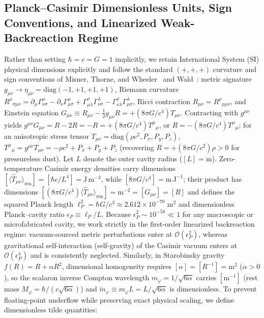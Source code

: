 \documentclass[aps,prd,twocolumn,10pt,showkeys,nofootinbib,floatfix,longbibliography]{revtex4-2}
\begin{document}
\subsection{Planck--Casimir Dimensionless Units, Sign Conventions, and Linearized Weak-Backreaction Regime}
Rather than setting $\hbar = c = G = 1$ implicitly, we retain International System (SI) physical dimensions explicitly and follow the standard $(+,+,+)$ curvature and sign conventions of Misner, Thorne, and Wheeler~\cite{misner1973} and Wald~\cite{wald1984}: metric signature $g_{\mu\nu} \to \eta_{\mu\nu} = \mathrm{diag}(-1,+1,+1,+1)$, Riemann curvature $R^\rho{}_{\sigma\mu\nu} = \partial_\mu\Gamma^\rho_{\nu\sigma} - \partial_\nu\Gamma^\rho_{\mu\sigma} + \Gamma^\rho_{\mu\lambda}\Gamma^\lambda_{\nu\sigma} - \Gamma^\rho_{\nu\lambda}\Gamma^\lambda_{\mu\sigma}$, Ricci contraction $R_{\mu\nu} = R^\rho{}_{\mu\rho\nu}$, and Einstein equation $G_{\mu\nu} \equiv R_{\mu\nu} - \frac{1}{2}g_{\mu\nu}R = +(8\pi G/c^4)T_{\mu\nu}$. Contracting with $g^{\mu\nu}$ yields $g^{\mu\nu}G_{\mu\nu} = R - 2R = -R = +(8\pi G/c^4)T^\mu{}_\mu$, or $R = -(8\pi G/c^4)T^\mu{}_\mu$; for an anisotropic stress tensor $T_{\mu\nu} = \mathrm{diag}(\rho c^2, P_x, P_y, P_z)$, $T^\mu{}_\mu = g^{\mu\nu}T_{\mu\nu} = -\rho c^2 + P_x + P_y + P_z$ (recovering $R = +(8\pi G/c^2)\rho > 0$ for pressureless dust). Let $L$ denote the outer cavity radius ($[L] = \mathrm{m}$). Zero-temperature Casimir energy densities carry dimensions $[\langle\hat{T}_{\mu\nu}\rangle_{\mathrm{ren}}] = [\hbar c / L^4] = \mathrm{J}\,\mathrm{m}^{-3}$, while $[8\pi G/c^4] = \mathrm{m}\,\mathrm{J}^{-1}$; their product has dimensions $[(8\pi G/c^4)\langle\hat{T}_{\mu\nu}\rangle_{\mathrm{ren}}] = \mathrm{m}^{-2} = [G_{\mu\nu}] = [R]$ and defines the squared Planck length $\ell_P^2 = \hbar G / c^3 \approx 2.612 \times 10^{-70}\text{ m}^2$ and dimensionless Planck--cavity ratio $\epsilon_P \equiv \ell_P / L$. Because $\epsilon_P^2 \sim 10^{-58} \ll 1$ for any macroscopic or microfabricated cavity, we work strictly in the first-order linearized backreaction regime: vacuum-sourced metric perturbations enter at $\mathcal{O}(\epsilon_P^2)$, whereas gravitational self-interaction (self-gravity) of the Casimir vacuum enters at $\mathcal{O}(\epsilon_P^4)$ and is consistently neglected. Similarly, in Starobinsky gravity $f(R) = R + \alpha R^2$, dimensional homogeneity requires $[\alpha] = [R^{-1}] = \mathrm{m}^2$ ($\alpha > 0$), so the scalaron inverse Compton wavelength $m_\varphi = 1/\sqrt{6\alpha}$ carries $[\mathrm{m}^{-1}]$ (rest mass $M_\varphi = \hbar / (c\sqrt{6\alpha})$) and $\tilde{m}_\varphi \equiv m_\varphi L = L/\sqrt{6\alpha}$ is dimensionless. To prevent floating-point underflow while preserving exact physical scaling, we define dimensionless tilde quantities:
\end{document}
